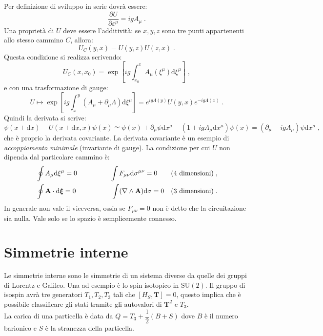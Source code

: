 \documentclass[10pt,a4paper]{report}
\theoremstyle{definition}
\numberwithin{equation}{section}
\newcommand{\diff}[1][]{\mathrm{d}#1}
\begin{document}
Per definizione di sviluppo in serie dovrà essere:
\begin{equation}
\frac{\partial U}{\partial \varepsilon^{\mu}}=igA_{\mu}\;.
\end{equation}
Una proprietà di $U$ deve essere l'additività: se $x,y,z$ sono tre punti appartenenti allo stesso cammino $C$, allora:
$$
U_C(y,x)=U(y,z)U(z,x)\;.
$$
Questa condizione si realizza scrivendo:
\begin{equation}
U_C(x,x_0)=\exp\left[ig\int_{x_0}^x A_{\mu}(\xi^{\mu})\diff{\xi^{\mu}}\right]\;,
\end{equation}
e con una trasformazione di gauge:
\begin{equation}
U\longmapsto \exp\left[ig\int_x^y(A_{\mu}+\partial_{\mu}\Lambda)\diff{\xi^{\mu}}\right]=e^{ig\Lambda(y)}U(y,x)e^{-ig\Lambda(x)}\;.
\end{equation}
Quindi la derivata si scrive:
\begin{equation*}
\psi(x+\diff{x})-U(x+\diff{x},x)\psi(x)\simeq \psi(x)+\partial_{\mu}\psi\diff{x^{\mu}}-(1+igA_{\mu}\diff{x^{\mu}})\psi(x)=(\partial_{\mu}-igA_{\mu})\psi\diff{x^{\mu}}\;,
\end{equation*}
che è proprio la derivata covariante. La derivata covariante è un esempio di \textit{accoppiamento minimale} (invariante di gauge). La condizione per cui $U$ non dipenda dal particolare cammino è:
\begin{align}
&\oint A_{\mu}\diff{\xi^{\mu}}=0 \qquad &\qquad \int F_{\mu\nu}\diff{\sigma^{\mu\nu}}=0\qquad \mbox{(4 dimensioni)} \;,\notag \\
&\oint \mathbf{A}\cdot\diff{\boldsymbol{\xi}}=0 \qquad &\qquad \int (\nabla\wedge\mathbf{A})\diff{\sigma}=0 \quad \mbox{(3 dimensioni)}\;.
\end{align}
In generale non vale il viceversa, ossia se $F_{\mu\nu}=0$ non è detto che la circuitazione sia nulla. Vale solo se lo spazio è semplicemente connesso.
\section{Simmetrie interne}
Le simmetrie interne sono le simmetrie di un sistema diverse da quelle dei gruppi di Lorentz e Galileo. Una ad esempio è lo spin isotopico in $\mathrm{SU}(2)$. Il gruppo di isospin avrà tre generatori $T_1,T_2,T_3$ tali che $[H_S,\mathbf{T}]=0$, questo implica che è possibile classificare gli stati tramite gli autovalori di $\mathbf{T}^2$ e $T_3$. \\
La carica di una particella è data da $Q=T_3+\dfrac{1}{2}(B+S)$ dove $B$ è il numero barionico e $S$ è la stranezza della particella.
\end{document}
